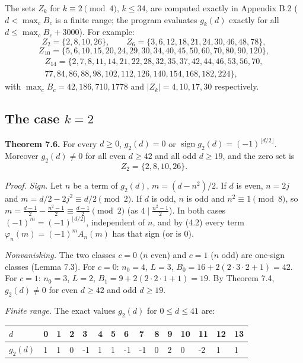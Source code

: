 The sets \(Z_k\) for \(k\equiv2\pmod4\), \(k\le34\), are computed exactly in Appendix B.2 (\(d<\max_cB_c\) is a finite range; the program evaluates \(g_k(d)\) exactly for all \(d\le\max_cB_c+3000\)). For example:
\[Z_2=\{2,8,10,26\},\qquad Z_6=\{3,6,12,18,21,24,30,46,48,78\},\]
\[Z_{10}=\{5,6,10,15,20,24,29,30,34,40,45,50,60,70,80,90,120\},\]
\begin{multline*}Z_{14}=\{2,7,8,11,14,21,22,28,32,35,37,42,44,46,53,56,70,\\77,84,86,88,98,102,112,126,140,154,168,182,224\},\end{multline*}
with \(\max_cB_c=42,186,710,1778\) and \(|Z_k|=4,10,17,30\) respectively.

\subsection{\texorpdfstring{The case \(k=2\)}{The case k=2}}\label{the-case-k2}

\textbf{Theorem 7.6.} For every \(d\ge0\), \(g_2(d)=0\) or \(\operatorname{sign}g_2(d)=(-1)^{\lfloor d/2\rfloor}\). Moreover \(g_2(d)\ne0\) for all even \(d\ge42\) and all odd \(d\ge19\), and the zero set is
\[Z_2=\{2,8,10,26\}.\]

\emph{Proof.} \emph{Sign.} Let \(n\) be a term of \(g_2(d)\), \(m=(d-n^2)/2\). If \(d\) is even, \(n=2j\) and \(m=d/2-2j^2\equiv d/2\pmod2\). If \(d\) is odd, \(n\) is odd and \(n^2\equiv1\pmod8\), so \(m=\frac{d-1}2-\frac{n^2-1}{2}\equiv\frac{d-1}2\pmod 2\) (as \(4\mid\frac{n^2-1}2\)). In both cases \((-1)^m=(-1)^{\lfloor d/2\rfloor}\), independent of \(n\), and by (4.2) every term \(\varphi_n(m)=(-1)^mA_n(m)\) has that sign (or is \(0\)).

\emph{Nonvanishing.} The two classes \(c=0\) (\(n\) even) and \(c=1\) (\(n\) odd) are one-sign classes (Lemma 7.3). For \(c=0\): \(n_0=4\), \(L=3\), \(B_0=16+2(2\cdot3\cdot2+1)=42\). For \(c=1\): \(n_0=3\), \(L=2\), \(B_1=9+2(2\cdot2\cdot1+1)=19\). By Theorem 7.4, \(g_2(d)\ne0\) for even \(d\ge42\) and odd \(d\ge19\).

\emph{Finite range.} The exact values \(g_2(d)\) for \(0\le d\le41\) are:

\begin{longtable}[]{@{}lllllllllllllll@{}}
\toprule\noalign{}
\(d\) & 0 & 1 & 2 & 3 & 4 & 5 & 6 & 7 & 8 & 9 & 10 & 11 & 12 & 13 \\
\midrule\noalign{}
\endhead
\bottomrule\noalign{}
\endlastfoot
\(g_2(d)\) & 1 & 1 & 0 & -1 & 1 & 1 & -1 & -1 & 0 & 2 & 0 & -2 & 1 & 1 \\
\end{longtable}

